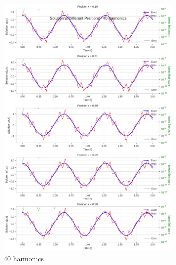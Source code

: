 \begin{figure}[H]
\begin{subfigure}[b]{0.32\textwidth}
        \includegraphics[width=\textwidth]{figures/space_slices_40h.png}
        \caption{40 harmonics}
    \end{subfigure}
    \hfill
    \begin{subfigure}[b]{0.32\textwidth}
        \centering

\end{subfigure}
\end{figure}
